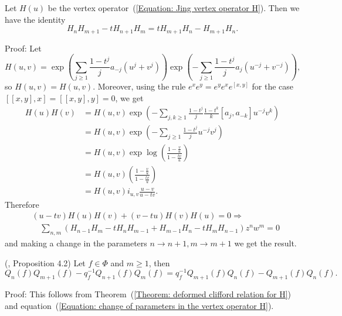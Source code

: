 \begin{dang}
    \begin{theorem}\cite{jing1991vertex}\label{Theorem: deformed clifford relation for H}
        Let $H(u)$ be the vertex operator~(\ref{Equation: Jing vertex operator H}). Then we have the identity
        \begin{equation}
            H_{n}H_{m+1}-tH_{n+1}H_m = tH_{m+1}H_n-H_{m+1}H_n.
        \end{equation}
    \end{theorem}
\end{dang}
Proof: Let 
\begin{equation}
    H(u,v)=\exp\left(\sum_{j\geq1}\frac{1-t^j}{j}a_{-j}(u^j+v^j)\right)\exp\left(-\sum_{j\geq1}\frac{1-t^j}{j}a_j(u^{-j}+v^{-j})\right),
\end{equation}
so $H(u,v)=H(u,v)$. Moreover, using the rule $e^xe^y=e^ye^xe^{[x,y]}$ for the case $[[x,y],x]=[[x,y],y]=0$, we get
\begin{equation}
\begin{split}
      H(u)H(v) &= H(u,v)\exp\left(-\sum_{j,k\geq1}\frac{1-t^j}{j}\frac{1-t^k}{k}\left[a_{j},a_{-k}\right]u^{-j}v^k\right)\\
      &= H(u,v)\exp\left(-\sum_{j\geq1}\frac{1-t^j}{j}u^{-j}v^j\right)\\
      &=H(u,v)\exp\log\left(\frac{1-\frac{v}{u}}{1-\frac{tv}{u}}\right)\\
      &=H(u,v)\left(\frac{1-\frac{v}{u}}{1-\frac{tv}{u}}\right)\\
      &=H(u,v)i_{u,v}\frac{u-v}{u-tv}.
\end{split}
\end{equation}
Therefore
\begin{equation}
\begin{split}
     &(u-tv)H(u)H(v) +(v-tu)H(v)H(u) = 0 \Rightarrow\\
     &\quad\sum_{n,m}(H_{n-1}H_m-tH_nH_{m-1}+H_{m-1}H_n-tH_mH_{n-1})z^nw^m = 0
\end{split}
\end{equation}
 and making a change in the parameters $n\to n+1, m\to m+1$ we get the result.
 \begin{dang}
     \begin{corollary}(\cite{jing2024characters}, Proposition 4.2)
         Let $f\in \Phi$ and $m\geq1$, then
         \begin{equation}\label{Equation: deformed clifford for Q_n(f)}
             Q_n(f)Q_{m+1}(f)-q_f^{-1}Q_{n+1}(f)Q_{m}(f)=q_f^{-1}Q_{m+1}(f)Q_n(f)-Q_{m+1}(f)Q_n(f).
         \end{equation}
     \end{corollary}
 \end{dang}
 Proof: This follows from Theorem~(\ref{Theorem: deformed clifford relation for H}) and equation~(\ref{Equation: change of parameters in the vertex operator H}).\par

